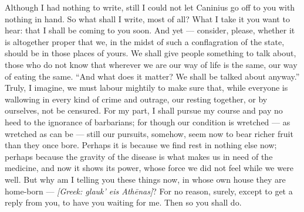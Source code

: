 

 Although I had nothing to write, still I could not let Caninius go off to you with nothing in hand. So what shall I write, most of all? What I take it you want to hear: that I shall be coming to you soon. And yet --- consider, please, whether it is altogether proper that we, in the midst of such a conflagration of the state, should be in those places of yours. We shall give people something to talk about, those who do not know that wherever we are our way of life is the same, our way of eating the same. ``And what does it matter? We shall be talked about anyway.'' Truly, I imagine, we must labour mightily to make sure that, while everyone is wallowing in every kind of crime and outrage, our resting together, or by ourselves, not be censured. For my part, I shall pursue my course and pay no heed to the ignorance of barbarians; for though our condition is wretched --- as wretched as can be --- still our pursuits, somehow, seem now to bear richer fruit than they once bore. Perhaps it is because we find rest in nothing else now; perhaps because the gravity of the disease is what makes us in need of the medicine, and now it shows its power, whose force we did not feel while we were well. But why am I telling you these things now, in whose own house they are home-born --- \textit{[Greek: glauk' eis Athēnas]}? For no reason, surely, except to get a reply from you, to have you waiting for me. Then so you shall do.

